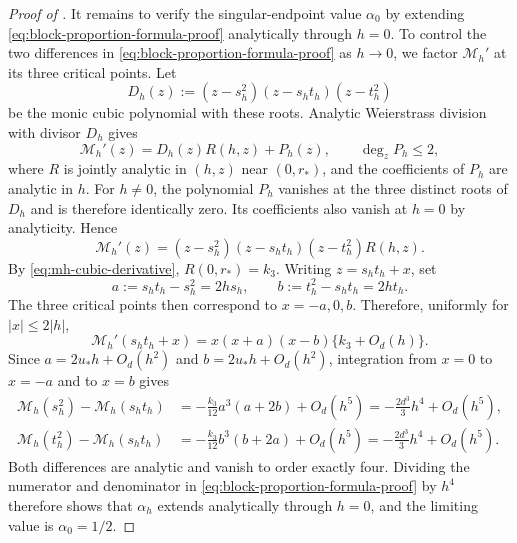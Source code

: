 \begin{proof}[Proof of ]
It remains to verify the singular-endpoint value $\alpha_0$
by extending \eqref{eq:block-proportion-formula-proof} analytically through $h=0$.
To control the two differences in \eqref{eq:block-proportion-formula-proof} as
$h\to0$, we factor $\mathcal M_h'$ at its three critical points.  Let
\[
  D_h(z):=(z-s_h^2)(z-s_ht_h)(z-t_h^2)
\]
be the monic cubic polynomial with these roots.  Analytic Weierstrass division
with divisor $D_h$ gives
\[
  \mathcal M_h'(z)=D_h(z)R(h,z)+P_h(z),
  \qquad \deg_z P_h\le2,
\]
where $R$ is jointly analytic in $(h,z)$ near $(0,r_*)$, and the coefficients
of $P_h$ are analytic in $h$.  For $h\ne0$, the polynomial $P_h$ vanishes at
the three distinct
roots of $D_h$ and is therefore identically zero.  Its coefficients also
vanish at $h=0$ by analyticity.  Hence
\begin{equation}\label{eq:mh-factorization-proof}
  \mathcal M_h'(z)
  =(z-s_h^2)(z-s_ht_h)(z-t_h^2)R(h,z).
\end{equation}
By \eqref{eq:mh-cubic-derivative}, $R(0,r_*)=k_3$.  Writing
$z=s_ht_h+x$, set
\[
  a:=s_ht_h-s_h^2=2hs_h,
  \qquad
  b:=t_h^2-s_ht_h=2ht_h.
\]
The three critical points then correspond to $x=-a,0,b$.  Therefore,
uniformly for $|x|\le2|h|$,
\[
  \mathcal M_h'(s_ht_h+x)
  =x(x+a)(x-b)\{k_3+O_d(h)\}.
\]
Since $a=2u_*h+O_d(h^2)$ and $b=2u_*h+O_d(h^2)$, integration from $x=0$ to
$x=-a$ and to $x=b$ gives
\begin{align*}
  \mathcal M_h(s_h^2)-\mathcal M_h(s_ht_h)
  &=-\frac{k_3}{12}a^3(a+2b)+O_d(h^5)
    =-\frac{2d^3}{3}h^4+O_d(h^5),\\
  \mathcal M_h(t_h^2)-\mathcal M_h(s_ht_h)
  &=-\frac{k_3}{12}b^3(b+2a)+O_d(h^5)
    =-\frac{2d^3}{3}h^4+O_d(h^5).
\end{align*}
Both differences are analytic and vanish to order exactly four.  Dividing
the numerator and denominator in \eqref{eq:block-proportion-formula-proof} by $h^4$
therefore shows that $\alpha_h$ extends analytically through $h=0$, and
the limiting value is $\alpha_0=1/2$. 


\end{proof}
